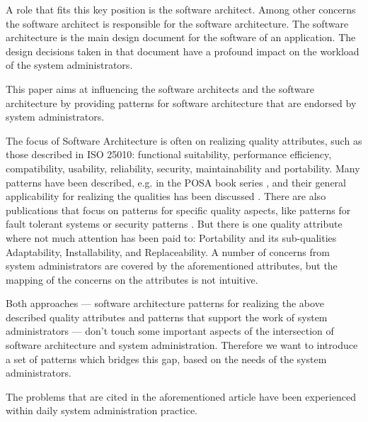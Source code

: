A role that fits this key position is the software architect. Among other concerns the software architect is responsible for the software architecture. The software architecture is the main design document for the software of an application. The design decisions taken in that document have a profound impact on the workload of the system administrators. 

This paper aims at influencing the software architects and the software architecture by providing patterns for software architecture that are endorsed by system administrators.

The focus of Software Architecture is often on realizing quality attributes, such as those described in ISO 25010: functional suitability, performance efficiency, compatibility, usability, reliability, security, maintainability and portability. Many patterns have been described, e.g. in the POSA book series \cite{Buschmann1996}, and their general applicability for realizing the qualities has been discussed \cite{Harrison2011}. 
There are also publications that focus on patterns for specific quality aspects, like patterns for fault tolerant systems \cite{Hanmer2007} or security patterns \cite{Schumacher2005}.
 But there is one quality attribute where not much attention has been paid to: Portability and its sub-qualities Adaptability, Installability, and Replaceability. A number of concerns from system administrators are covered by the aforementioned attributes, but the mapping of the concerns on the attributes is not intuitive.

Both approaches --- software architecture patterns for realizing the above described quality attributes and patterns that support the work of system administrators --- don't touch some important aspects of the intersection of software architecture and system administration. Therefore we want to introduce a set of patterns which bridges this gap, based on the needs of the system administrators. 

The problems that are cited in the aforementioned article have been experienced within daily system administration practice. 

